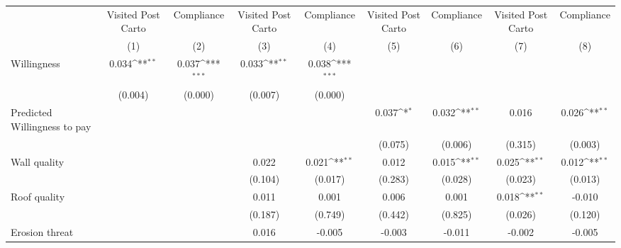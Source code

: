 {
\def\sym#1{\ifmmode^{#1}\else\(^{#1}\)\fi}
\begin{tabular}{l*{8}{c}}
\toprule
                &\multicolumn{1}{c}{Visited Post Carto}&\multicolumn{1}{c}{Compliance}&\multicolumn{1}{c}{Visited Post Carto}&\multicolumn{1}{c}{Compliance}&\multicolumn{1}{c}{Visited Post Carto}&\multicolumn{1}{c}{Compliance}&\multicolumn{1}{c}{Visited Post Carto}&\multicolumn{1}{c}{Compliance}\\
                &\multicolumn{1}{c}{(1)}         &\multicolumn{1}{c}{(2)}         &\multicolumn{1}{c}{(3)}         &\multicolumn{1}{c}{(4)}         &\multicolumn{1}{c}{(5)}         &\multicolumn{1}{c}{(6)}         &\multicolumn{1}{c}{(7)}         &\multicolumn{1}{c}{(8)}         \\
\midrule
Willingness     &    0.034\sym{**} &    0.037\sym{***}&    0.033\sym{**} &    0.038\sym{***}&                  &                  &                  &                  \\
                &  (0.004)         &  (0.000)         &  (0.007)         &  (0.000)         &                  &                  &                  &                  \\
Predicted Willingness to pay&                  &                  &                  &                  &    0.037\sym{*}  &    0.032\sym{**} &    0.016         &    0.026\sym{**} \\
                &                  &                  &                  &                  &  (0.075)         &  (0.006)         &  (0.315)         &  (0.003)         \\
Wall quality    &                  &                  &    0.022         &    0.021\sym{**} &    0.012         &    0.015\sym{**} &    0.025\sym{**} &    0.012\sym{**} \\
                &                  &                  &  (0.104)         &  (0.017)         &  (0.283)         &  (0.028)         &  (0.023)         &  (0.013)         \\
Roof quality    &                  &                  &    0.011         &    0.001         &    0.006         &    0.001         &    0.018\sym{**} &   -0.010         \\
                &                  &                  &  (0.187)         &  (0.749)         &  (0.442)         &  (0.825)         &  (0.026)         &  (0.120)         \\
Erosion threat  &                  &                  &    0.016         &   -0.005         &   -0.003         &   -0.011         &   -0.002         &   -0.005         \\

\end{tabular}}
